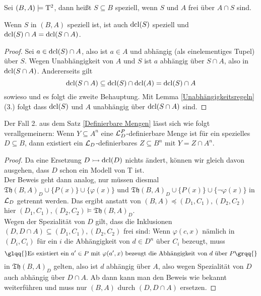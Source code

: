 \begin{definition}
	Sei $(B,A)\models\operatorname{T^2}$, dann heißt $S\subseteq B$ speziell, wenn $S$ und $A$ frei über $A\cap S$ sind.
\end{definition}

\begin{lemma}\label{Spezialität dcl}
	Wenn $S$ in $(B,A)$ speziell ist, ist auch $\operatorname{dcl}(S)$ speziell und $\operatorname{dcl}(S)\cap A=\operatorname{dcl}(S\cap A)$.
\end{lemma}
\begin{proof}
	Sei $a\in\operatorname{dcl}(S)\cap A$, also ist $a\in A$ und abhängig (als einelementiges Tupel) über $S$. Wegen Unabhängigkeit von $A$ und $S$ ist $a$ abhängig über $S\cap A$, also in $\operatorname{dcl}(S\cap A)$. Andererseits gilt $$\operatorname{dcl}(S\cap A)\subseteq\operatorname{dcl}(S)\cap\operatorname{dcl}(A)=\operatorname{dcl}(S)\cap A$$ sowieso und es folgt die zweite Behauptung. Mit Lemma \ref{Unabhängigkeitsregeln} (3.) folgt dass $\operatorname{dcl}(S)$ und $A$ unabhängig über $\operatorname{dcl}(S\cap A)$ sind.
\end{proof}

\begin{lemma}\label{Definierbare Mengen Spezialität}
	Der Fall 2. aus dem Satz \ref{Definierbare Mengen} lässt sich wie folgt verallgemeinern: Wenn $Y\subseteq A^n$ eine $\mathcal{L}^P_D$-definierbare Menge ist für ein spezielles $D\subseteq B$, dann existiert ein $\mathcal{L}_D$-definierbares $Z\subseteq B^n$ mit $Y=Z\cap A^n$.
\end{lemma}
\begin{proof}
	Da eine Ersetzung $D\rightarrowtail\operatorname{dcl}(D)$ nichts ändert, können wir gleich davon ausgehen, dass $D$ schon ein Modell von T ist.\\
	Der Beweis geht dann analog, nur müssen diesmal $\mathfrak{Th}(B,A)_D\cup\{P(x)\}\cup\{\varphi(x)\}$ und $\mathfrak{Th}(B,A)_D\cup\{P(x)\}\cup\{\neg\varphi(x)\}$ in $\mathcal{L}_D$ getrennt werden. Das ergibt anstatt von $(B,A)\preceq(D_1,C_1),(D_2,C_2)$ hier $(D_1,C_1),(D_2,C_2)\models\mathfrak{Th}(B,A)_D$.\\
	Wegen der Spezialität von $D$ gilt, dass die Inklusionen $(D,D\cap A)\subseteq(D_1,C_1),(D_2,C_2)$ frei sind: Wenn $\varphi(c,x)$ nämlich in $(D_i,C_i)$ für ein $i$ die Abhängigkeit von $d\in D^n$ über $C_i$ bezeugt, muss $$\glqq{}\text{Es existiert ein }a'\in P\text{ mit }\varphi(a',x)\text{ bezeugt die Abhängigkeit von }d\text{ über }P\grqq{}$$ in $\mathfrak{Th}(B,A)_D$ gelten, also ist $d$ abhängig über $A$, also wegen Spezialität von $D$ auch abhängig über $D\cap A$. Ab dann kann man den Beweis wie bekannt weiterführen und muss nur $(B,A)$ durch $(D,D\cap A)$ ersetzen.
\end{proof}

